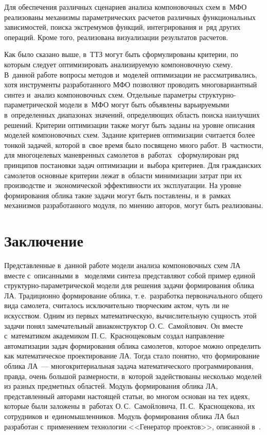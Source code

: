 \begin{multicols}{2}
  Для обеспечения различных сценариев анализа компоновочных схем 
в~МФО реализованы механизмы параметрических 
расчетов различных функциональных зависимостей, поиска экстремумов 
функций, интегрирования и~ряд других операций. Кроме того, реализована 
визуализации результатов рас\-четов.
  
  Как было сказано выше, в~ТТЗ могут быть сформулированы критерии, по 
которым следует оптимизировать ана\-ли\-зи\-ру\-емую компоновочную \mbox{схему}. 
В~данной работе вопросы методов и~моделей оптимизации не рассматривались, 
хотя инструменты разработанного МФО позволяют 
проводить многовариантный синтез и~анализ компоновочных схем. Отдельные 
параметры струк\-тур\-но-па\-ра\-мет\-ри\-че\-ской модели в~МФО могут быть 
объявлены варь\-и\-ру\-емы\-ми в~определенных диапазонах значений, 
опре\-де\-ля\-ющих об\-ласть поиска наилучших решений. Критерии оптимизации 
также могут быть заданы на уровне описания моделей компоновочных схем. 
Задание критериев оптимизации считается более тонкой задачей, которой 
в~свое время было посвящено много работ. В~част\-ности, для многоцелевых 
маневренных самолетов в~работах~\cite{15-fl, 16-fl, 17-fl} сформулирован ряд 
принципов по\-ста\-нов\-ки задач оптимизации и~выбора критериев. Для 
гражданских самолетов основные критерии лежат в~об\-ласти минимизации 
затрат при их производстве и~экономической эф\-фек\-тив\-ности их эксплуатации. 
На уровне формирования облика такие задачи могут быть по\-став\-ле\-ны, 
и~в~рамках механизмов разработанного модуля, по мнению авторов, могут быть 
реализованы.
  

\section{Заключение}

  Представленные в~данной работе модели анализа компоновочных схем 
ЛА вместе с~описанными в~\cite{5-fl} моделями синтеза 
представляют собой пример единой струк\-тур\-но-па\-ра\-мет\-ри\-че\-ской 
модели для решения задачи формирования облика ЛА. Традиционно 
формирование облика, т.\,е.\ разработка первоначального общего вида 
самолета, считалось исключительно творческим актом, чуть ли не искусством. 
Одним из первых математическую, вы\-чис\-ли\-тель\-ную сущ\-ность этой задачи 
понял замечательный авиаконструктор О.\,С.~Са\-мой\-ло\-вич. Он вместе 
с~математиком академиком П.\,С.~Крас\-но\-ще\-ко\-вым создал направление 
автоматизации задач формирования облика самолетов, которое можно 
определить как математическое проектирование ЛА. Тогда стало понятно, что 
формирование облика ЛА~--- многокритериальная задача математического 
программирования, правда, очень большой раз\-мер\-ности, в~которой 
задействованы несколько моделей из разных пред\-мет\-ных областей. Модуль 
формирования облика ЛА, пред\-став\-лен\-ный авторами на\-сто\-ящей статьи, во 
многом основан на тех идеях, которые были заложены в~работах 
О.\,С.~Самойловича, П.\,С.~Краснощекова, их сотрудников 
и~единомышленников. Модуль формирования облика ЛА был разработан 
с~применением технологии <<Генератор проектов>>, описанной в~\cite{18-fl}.
  

\end{multicols}
